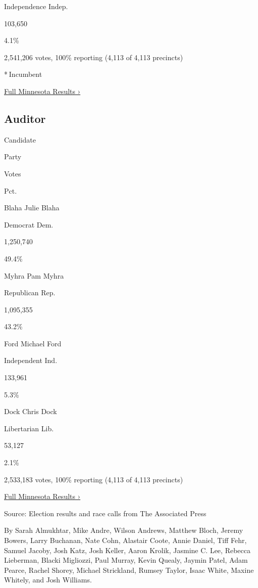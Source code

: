 Independence Indep.

103,650

4.1\%

2,541,206 votes, 100\% reporting (4,113 of 4,113 precincts)

* Incumbent

\href{https://www.nytimes3xbfgragh.onion/interactive/2018/11/06/us/elections/results-minnesota-elections.html}{Full
Minnesota Results ›}

\hypertarget{auditor}{%
\subsection{Auditor}\label{auditor}}

Candidate

Party

Votes

Pct.

 Blaha Julie Blaha

Democrat Dem.

1,250,740

49.4\%

 Myhra Pam Myhra

Republican Rep.

1,095,355

43.2\%

 Ford Michael Ford

Independent Ind.

133,961

5.3\%

 Dock Chris Dock

Libertarian Lib.

53,127

2.1\%

2,533,183 votes, 100\% reporting (4,113 of 4,113 precincts)

\href{https://www.nytimes3xbfgragh.onion/interactive/2018/11/06/us/elections/results-minnesota-elections.html}{Full
Minnesota Results ›}

Source: Election results and race calls from The Associated Press

By Sarah Almukhtar, Mike Andre, Wilson Andrews, Matthew Bloch, Jeremy
Bowers, Larry Buchanan, Nate Cohn, Alastair Coote, Annie Daniel, Tiff
Fehr, Samuel Jacoby, Josh Katz, Josh Keller, Aaron Krolik, Jasmine C.
Lee, Rebecca Lieberman, Blacki Migliozzi, Paul Murray, Kevin Quealy,
Jaymin Patel, Adam Pearce, Rachel Shorey, Michael Strickland, Rumsey
Taylor, Isaac White, Maxine Whitely, and Josh Williams.

